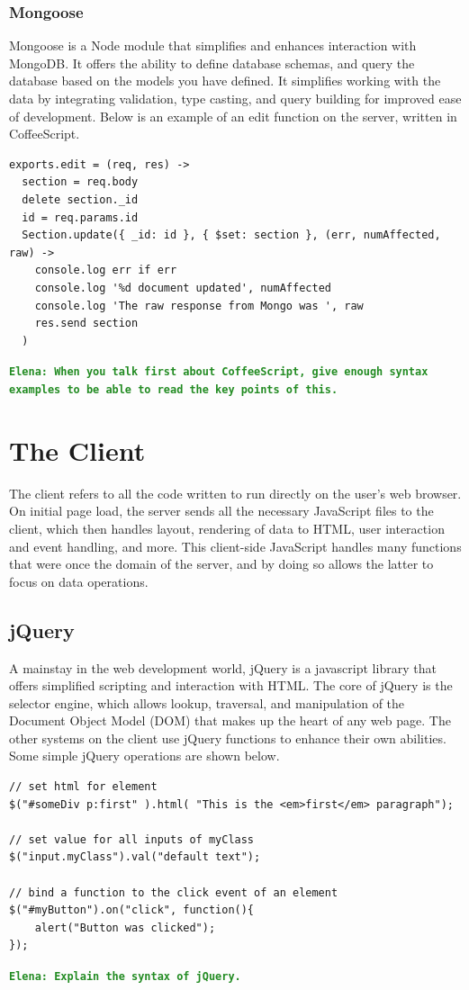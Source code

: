 \documentclass[12pt]{article}
\newcommand{\comment}[1]{{\bf \tt  {#1}}}
\newcommand{\emcomment}[1]{\textcolor{ForestGreen}{\comment{Elena: {#1}}}}
\begin{document}
\subsubsection{Mongoose}\label{sec:mongoose}
Mongoose is a Node module that simplifies and enhances interaction with MongoDB. It offers the ability to define database schemas, and query the database based on the models you have defined. It simplifies working with the data by integrating validation, type casting, and query building for improved ease of development. Below is an example of an edit function on the server, written in CoffeeScript.
\begin{verbatim}
exports.edit = (req, res) ->
  section = req.body
  delete section._id
  id = req.params.id
  Section.update({ _id: id }, { $set: section }, (err, numAffected, raw) ->
    console.log err if err
    console.log '%d document updated', numAffected
    console.log 'The raw response from Mongo was ', raw
    res.send section
  )
\end{verbatim}
\emcomment{When you talk first about CoffeeScript, give enough syntax examples to be able to read the key points of this.}


\section{The Client}\label{sec:client}
The client refers to all the code written to run directly on the user's web browser. On initial page load, the server sends all the necessary JavaScript files to the client, which then handles layout, rendering of data to HTML, user interaction and event handling, and more. This client-side JavaScript handles many functions that were once the domain of the server, and by doing so allows the latter to focus on data operations.

\subsection{jQuery}\label{sec:jquery}
A mainstay in the web development world, jQuery is a javascript library that offers simplified scripting and interaction with HTML. The core of jQuery is the selector engine, which allows lookup, traversal, and manipulation of the Document Object Model (DOM) that makes up the heart of any web page. The other systems on the client use jQuery functions to enhance their own abilities. Some simple jQuery operations are shown below.
\begin{verbatim}
// set html for element
$("#someDiv p:first" ).html( "This is the <em>first</em> paragraph");

// set value for all inputs of myClass
$("input.myClass").val("default text");

// bind a function to the click event of an element
$("#myButton").on("click", function(){
    alert("Button was clicked");
});
\end{verbatim}
\emcomment{Explain the syntax of jQuery.}
\end{document}
